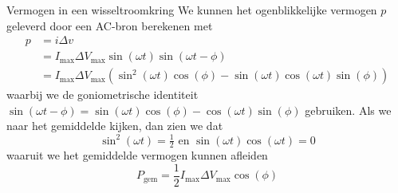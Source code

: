 \newpage


\begin{pro}{Vermogen in een wisseltroomkring}
    We kunnen het ogenblikkelijke vermogen $p$ geleverd door een AC-bron berekenen met
    \begin{align*}
        p &= i \Delta v \\
          &= I_{\max}\Delta V_{\max}\sin(\omega t)\sin(\omega t - \phi) \\
          &= I_{\max}\Delta V_{\max}\left( \sin^2(\omega t)\cos(\phi) - \sin(\omega t)\cos(\omega t)\sin(\phi)\right)
    \end{align*} 
    waarbij we de goniometrische identiteit $\sin(\omega t - \phi) = \sin(\omega t)\cos(\phi) - \cos(\omega t)\sin(\phi)$ gebruiken. Als we naar het gemiddelde kijken, dan zien we dat
    \begin{equation*}
        \sin^2(\omega t) = \tfrac{1}{2} \text{ en } \sin(\omega t)\cos(\omega t) = 0 
    \end{equation*} 
    waaruit we het gemiddelde vermogen kunnen afleiden
    \begin{equation*}
        P_{\text{gem}} = \frac{1}{2}I_{\max}\Delta V_{\max}\cos(\phi)
    \end{equation*}
\end{pro}

